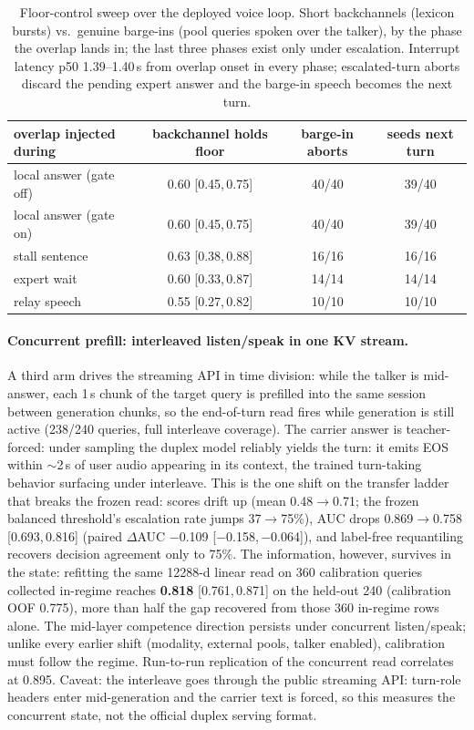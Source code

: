 \begin{table}[h]
\centering\small
\begin{tabular}{lccc}
\toprule
overlap injected during & backchannel holds floor & barge-in aborts &
seeds next turn \\
\midrule
local answer (gate off) & 0.60 [0.45,\,0.75] & 40/40 & 39/40 \\
local answer (gate on)  & 0.60 [0.45,\,0.75] & 40/40 & 39/40 \\
stall sentence          & 0.63 [0.38,\,0.88] & 16/16 & 16/16 \\
expert wait             & 0.60 [0.33,\,0.87] & 14/14 & 14/14 \\
relay speech            & 0.55 [0.27,\,0.82] & 10/10 & 10/10 \\
\bottomrule
\end{tabular}
\caption{Floor-control sweep over the deployed voice loop. Short
backchannels (lexicon bursts) vs.\ genuine barge-ins (pool queries
spoken over the talker), by the phase the overlap lands in; the last
three phases exist only under escalation. Interrupt latency
p50 1.39--1.40\,s from overlap onset in every phase; escalated-turn
aborts discard the pending expert answer and the barge-in speech
becomes the next turn.}
\label{tab:floor}
\end{table}

\paragraph{Concurrent prefill: interleaved listen/speak in one KV
stream.} A third arm drives the streaming API in time division: while
the talker is mid-answer, each 1\,s chunk of the target query is
prefilled into the same session between generation chunks, so
the end-of-turn read fires while generation is still active (238/240
queries, full interleave coverage). The carrier
answer is teacher-forced: under sampling the duplex model reliably
yields the turn: it emits EOS within $\sim$2\,s of user audio
appearing in its context, the trained turn-taking behavior surfacing
under interleave. This is the one shift on the transfer ladder that
breaks the frozen read: scores drift up (mean 0.48$\to$0.71; the
frozen balanced threshold's escalation rate jumps 37$\to$75\%), AUC drops
0.869$\to$0.758 [0.693,\,0.816] (paired $\Delta$AUC $-$0.109
[$-$0.158,\,$-$0.064]), and label-free requantiling recovers decision
agreement only to 75\%. The information, however, survives in the
state: refitting the same 12288-d linear read on 360
calibration queries collected in-regime reaches \textbf{0.818}
[0.761,\,0.871] on the held-out 240 (calibration OOF 0.775), more
than half the gap recovered from those 360 in-regime rows alone. The mid-layer competence direction persists under
concurrent listen/speak; unlike every earlier shift (modality,
external pools, talker enabled), calibration must follow the regime.
Run-to-run replication of the concurrent read correlates at 0.895.
Caveat: the interleave goes through the public streaming API:
turn-role headers enter mid-generation and the carrier text is forced, so this measures the concurrent state, not the official
duplex serving format.

